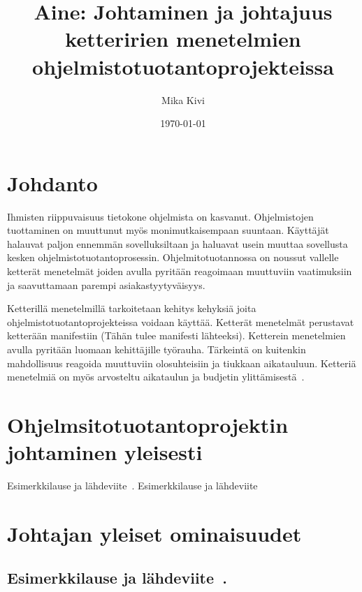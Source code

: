 \documentclass[finnish]{tktltiki2}
\title{Aine: Johtaminen ja johtajuus ketteririen menetelmien ohjelmistotuotantoprojekteissa}
\author{Mika Kivi}
\date{\today}
\theoremstyle{definition}
\theoremstyle{remark}
\begin{document}

\maketitle        %
\makeabstract     %

\tableofcontents  %
\newpage          %



\section{Johdanto}

Ihmisten riippuvaisuus tietokone ohjelmista on kasvanut. Ohjelmistojen tuottaminen on muuttunut myös monimutkaisempaan suuntaan. Käyttäjät halauvat paljon ennemmän sovelluksiltaan ja haluavat usein muuttaa sovellusta kesken ohjelmistotuotantoprosessin. Ohjelmitotuotannossa on noussut vallelle ketterät menetelmät joiden avulla pyritään reagoimaan muuttuviin vaatimuksiin ja saavuttamaan parempi asiakastyytyväisyys. 

Ketterillä menetelmillä tarkoitetaan kehitys kehyksiä joita ohjelmistotuotantoprojekteissa voidaan käyttää. Ketterät menetelmät perustavat ketterään manifestiin (Tähän tulee manifesti lähteeksi). Ketterein menetelmien avulla pyritään luomaan kehittäjille työrauha. Tärkeintä on kuitenkin mahdollisuus reagoida muuttuviin olosuhteisiin ja tiukkaan aikatauluun. Ketteriä menetelmiä on myös arvosteltu aikataulun ja budjetin ylittämisestä~\cite{Guo:2008:SSP:1414004.1414046}.

\section{Ohjelmsitotuotantoprojektin johtaminen yleisesti}

Esimerkkilause ja lähdeviite~\cite{Guo:2008:SSP:1414004.1414046}.
Esimerkkilause ja lähdeviite~\cite{Wang:2010:PPP:1810295.1810302}

\section{Johtajan yleiset ominaisuudet}

\subsection{Esimerkkilause ja lähdeviite~\cite{Wang:2009:PMP:1639950.1640049}.}
\end{document}
